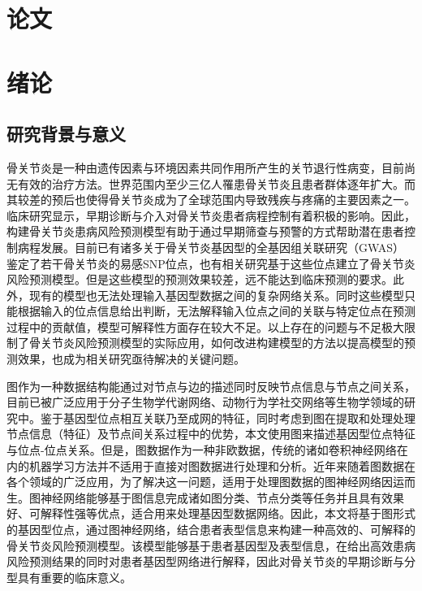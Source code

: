 \documentclass[
]{article}
\author{}
\date{}
\begin{document}
\hypertarget{ux8bbaux6587}{%
\section{论文}\label{ux8bbaux6587}}

\hypertarget{ux7eeaux8bba}{%
\section{绪论}\label{ux7eeaux8bba}}

\hypertarget{ux7814ux7a76ux80ccux666fux4e0eux610fux4e49}{%
\subsection{研究背景与意义}\label{ux7814ux7a76ux80ccux666fux4e0eux610fux4e49}}

骨关节炎是一种由遗传因素与环境因素共同作用所产生的关节退行性病变，目前尚无有效的治疗方法。世界范围内至少三亿人罹患骨关节炎且患者群体逐年扩大。而其较差的预后也使得骨关节炎成为了全球范围内导致残疾与疼痛的主要因素之一。临床研究显示，早期诊断与介入对骨关节炎患者病程控制有着积极的影响。因此，构建骨关节炎患病风险预测模型有助于通过早期筛查与预警的方式帮助潜在患者控制病程发展。目前已有诸多关于骨关节炎基因型的全基因组关联研究（GWAS）鉴定了若干骨关节炎的易感SNP位点，也有相关研究基于这些位点建立了骨关节炎风险预测模型。但是这些模型的预测效果较差，远不能达到临床预测的要求。此外，现有的模型也无法处理输入基因型数据之间的复杂网络关系。同时这些模型只能根据输入的位点信息给出判断，无法解释输入位点之间的关联与特定位点在预测过程中的贡献值，模型可解释性方面存在较大不足。以上存在的问题与不足极大限制了骨关节炎风险预测模型的实际应用，如何改进构建模型的方法以提高模型的预测效果，也成为相关研究亟待解决的关键问题。

图作为一种数据结构能通过对节点与边的描述同时反映节点信息与节点之间关系，目前已被广泛应用于分子生物学代谢网络、动物行为学社交网络等生物学领域的研究中。鉴于基因型位点相互关联乃至成网的特征，同时考虑到图在提取和处理处理节点信息（特征）及节点间关系过程中的优势，本文使用图来描述基因型位点特征与位点-位点关系。但是，图数据作为一种非欧数据，传统的诸如卷积神经网络在内的机器学习方法并不适用于直接对图数据进行处理和分析。近年来随着图数据在各个领域的广泛应用，为了解决这一问题，适用于处理图数据的图神经网络因运而生。图神经网络能够基于图信息完成诸如图分类、节点分类等任务并且具有效果好、可解释性强等优点，适合用来处理基因型数据网络。因此，本文将基于图形式的基因型位点，通过图神经网络，结合患者表型信息来构建一种高效的、可解释的骨关节炎风险预测模型。该模型能够基于患者基因型及表型信息，在给出高效患病风险预测结果的同时对患者基因型网络进行解释，因此对骨关节炎的早期诊断与分型具有重要的临床意义。
\end{document}
